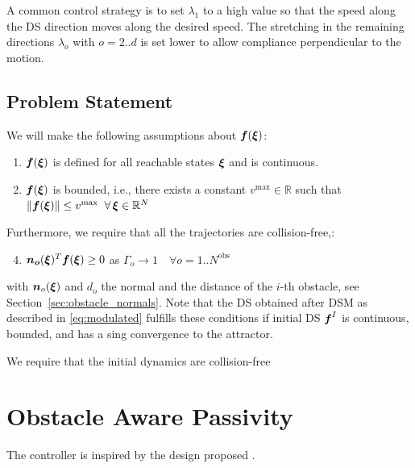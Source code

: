 \documentclass[conference]{IEEEtran}
\begin{document}
A common control strategy is to set $\lambda_1$ to a high value so that the speed along the DS direction moves along the desired speed. The stretching in the remaining directions $\lambda_o$ with $o = 2 .. d$ is set lower to allow compliance perpendicular to the motion. 


\subsection{Problem Statement}
We will make the following assumptions about $\boldsymbol{f}(\boldsymbol{\xi})$:
\begin{enumerate}
    \item $ \boldsymbol{f}(\boldsymbol{\xi})$ is defined for all reachable states $\boldsymbol{\xi}$ and is continuous.
    \item $\boldsymbol{f}(\boldsymbol{\xi})$ is bounded, i.e., there exists a constant $v^{\mathrm{max}} \in \mathbb{R}$ such that $\| \boldsymbol{f}(\boldsymbol{\xi}) \| \leq v^{\mathrm{max}} \;\; \forall \, \boldsymbol{\xi} \in \mathbb{R}^N$
\end{enumerate}

Furthermore, we require that all the trajectories are collision-free,: 
\begin{enumerate}
  \setcounter{enumi}{3}
  \item $\boldsymbol{n_o}(\boldsymbol{\xi})^T \boldsymbol{f}(\boldsymbol{\xi}) \geq 0$ as $\Gamma_o \rightarrow 1 
  \quad \forall o = 1 .. N^{\mathrm{obs}}$
\end{enumerate}
with $\boldsymbol{n}_o (\boldsymbol{\xi})$ and $d_o$ the normal and the distance of the $i$-th obstacle, see Section~\ref{sec:obstacle_normals}. 
Note that the DS obtained after DSM as described in \eqref{eq:modulated} fulfills these conditions if initial DS $\boldsymbol{f}^I$ is continuous, bounded, and has a sing convergence to the attractor.

We require that the initial dynamics are collision-free

\section{Obstacle Aware Passivity} \label{sec:obstacle_aware_passivity}
The controller is inspired by the design proposed \cite{kronander2015passive}.
\end{document}
